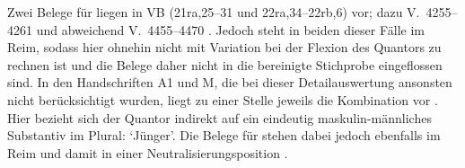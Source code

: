 \begin{exe}
\end{exe}

Zwei Belege für  liegen in VB (21ra,25--31 und
22ra,34--22rb,6) vor; dazu V.~4255--4261 und abweichend V.~4455--4470
\autocite[159, 163]{schroeder1895}. Jedoch steht  in beiden dieser
Fälle im Reim, sodass hier ohnehin nicht mit Variation bei der
Flexion des Quantors zu rechnen ist und die Belege daher nicht in die
bereinigte Stichprobe eingeflossen sind. In den Handschriften A1 und M,
die bei dieser Detailauswertung ansonsten nicht berücksichtigt wurden, liegt zu
einer Stelle jeweils die Kombination  vor .
Hier bezieht sich der Quantor indirekt auf ein eindeutig maskulin-männliches
Substantiv im Plural:  `Jünger'. Die Belege für 
stehen dabei jedoch ebenfalls im Reim und damit in einer
Neutralisierungsposition
\autocites[vgl.][662--663]{grimm1870}[89]{askedal1973}.

